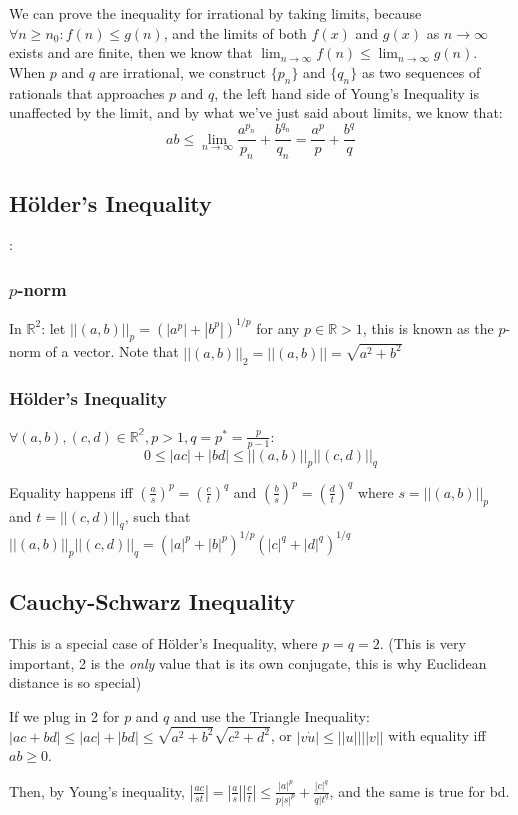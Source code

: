 We can prove the inequality for irrational by taking limits, because
$\forall n \geq n_0: f(n) \leq g(n)$, and the limits of both $f(x)$ and $g(x)$ as
$n\to\infty$ exists and are finite, then we know that $\lim_{n\to\infty}f(n)
\leq \lim_{n\to\infty} g(n)$. When $p$ and $q$ are irrational, we construct
$\{p_n\}$ and $\{q_n\}$ as two sequences of rationals that approaches $p$ and
$q$, the left hand side of Young's Inequality is unaffected by the limit, and by
what we've just said about limits, we know that:
$$ab \leq \lim_{n\to\infty} \frac{a^{p_n}}{p_n} + \frac{b^{q_n}}{q_n} =
\frac{a^p}{p} + \frac{b^q}{q}$$

\subsection{H\"{o}lder's Inequality}:
\subsubsection{$p$-norm}
In $\mathbb{R}^2$: let $||(a, b)||_p = (|a^p| + |b^p|)^{1/p}$ for any $p \in
\mathbb{R} > 1$, this is known as the $p$-norm of a vector. Note that $||(a,
b)||_2 = ||(a, b)|| = \sqrt{a^2 + b^2}$

\subsubsection{H\"{o}lder's Inequality}
$\forall (a, b), (c, d) \in \mathbb{R^2}, p > 1, q = p^* = \frac{p}{p-1}$:
$$ 0 \leq |ac| + |bd| \leq ||(a, b)||_p||(c, d)||_q$$

Equality happens iff $(\frac{a}{s})^p = (\frac{c}{t})^q$ and $(\frac{b}{s})^p =
(\frac{d}{t})^q$ where $s = ||(a, b)||_p$ and $t = ||(c, d)||_q$, such that $||(a, b)||_p||(c, d)||_q = (|a|^p + |b|^p)^{1/p}(|c|^q + |d|^q)^{1/q}$

\subsection{Cauchy-Schwarz Inequality}
This is a special case of H\"{o}lder's Inequality, where $p = q = 2$. (This is very important, 2 is the \textit{only} value that is its own conjugate, this is why Euclidean distance is so special)

If we plug in 2 for $p$ and $q$ and use the Triangle Inequality:
$|ac + bd| \leq |ac| + |bd| \leq \sqrt{a^2 + b^2} \sqrt{c^2 + d^2}$, or $|v \dot u| \leq ||u||||v||$ with equality iff $ab \geq 0$.

Then, by Young's inequality, $|\frac{ac}{st}| = |\frac{a}{s}||\frac{c}{t}| \leq \frac{|a|^p}{p|s|^p} + \frac{|c|^q}{q|t^q}$, and the same is true for bd.

